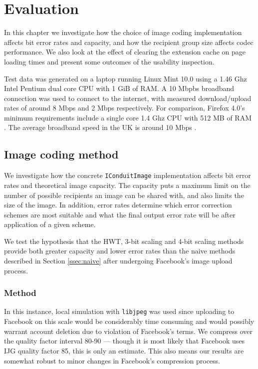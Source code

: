 \chapter{Evaluation}\label{ch:evaluation}
\label{eval}

In this chapter we investigate how the choice of image coding implementation affects bit error rates and capacity, and how the recipient group size affects codec performance. We also look at the effect of clearing the extension cache on page loading times and present some outcomes of the usability inspection.

Test data was generated on a laptop running Linux Mint 10.0 using a 1.46 Ghz Intel Pentium dual core CPU with 1 GiB of RAM. A 10 Mbpbs broadband connection was used to connect to the internet, with measured download/upload rates of around 8 Mbps and 2 Mbps respectively. For comparison, Firefox 4.0's minimum requirements include a single core 1.4 Ghz CPU with 512 MB of RAM \cite{firefox-req}. The average broadband speed in the UK is around 10 Mbps \cite{bband-stats}. 

\section{Image coding method}
\label{sec:imgcod}

We investigate how the concrete {\tt IConduitImage} implementation affects bit error rates and theoretical image capacity. The capacity puts a maximum limit on the number of possible recipients an image can be shared with, and also limits the size of the image. In addition, error rates determine which error correction schemes are most suitable and what the final output error rate will be after application of a given scheme.

We test the hypothesis that the HWT, 3-bit scaling and 4-bit scaling methods provide both greater capacity and lower error rates than the naive methods described in Section \ref{ssec:naive} after undergoing Facebook's image upload process.

\subsection{Method}

In this instance, local simulation with {\tt libjpeg} was used since uploading to Facebook on this scale would be considerably time consuming and would possibly warrant account deletion due to violation of Facebook's terms. We compress over the quality factor interval 80-90 --- though it is most likely that Facebook uses IJG quality factor 85, this is only an estimate. This also means our results are somewhat robust to minor changes in Facebook's compression process.


